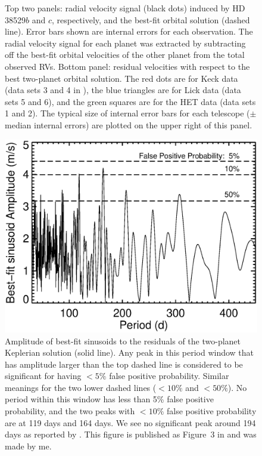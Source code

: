 \begin{figure}
\caption{Top two panels: radial velocity signal (black dots) induced
  by HD 38529$b$ and $c$, respectively, and the best-fit orbital
  solution (dashed line). Error bars shown are internal errors for
  each observation. The radial velocity signal for each planet was
  extracted by subtracting off the best-fit orbital velocities of the
  other planet from the total observed RVs. Bottom panel: residual
  velocities with respect to the best two-planet orbital solution. The
  red dots are for Keck data (data sets 3 and 4 in
  \cite{2013ApJ...768..155H}), the blue triangles are for Lick data
  (data sets 5 and 6), and the green squares are for the HET data
  (data sets 1 and 2). The typical size of internal error bars for
  each telescope ($\pm$ median internal errors) are plotted on the
  upper right of this panel.
\label{boottran:rvplot}}
\end{figure}


\begin{figure}
\includegraphics[scale=0.6]{boottran/nod.eps} 
\caption{Amplitude of best-fit sinusoids to the residuals of the
  two-planet Keplerian solution (solid line). Any peak in this period
  window that has amplitude larger than the top dashed line is
  considered to be significant for having $<5\%$ false positive
  probability. Similar meanings for the two lower dashed lines
  ($<10\%$ and $<50\%$). No period within this window has less than
  5\% false positive probability, and the two peaks with $<10\%$ false
  positive probability are at 119 days and 164 days. We see no
  significant peak around 194 days as reported by
  \cite{2010AJ....139.1844B}. This figure is published as Figure~3 in
  \cite{2013ApJ...768..155H} and was made by me.
\label{boottran:nod}}
\end{figure}


